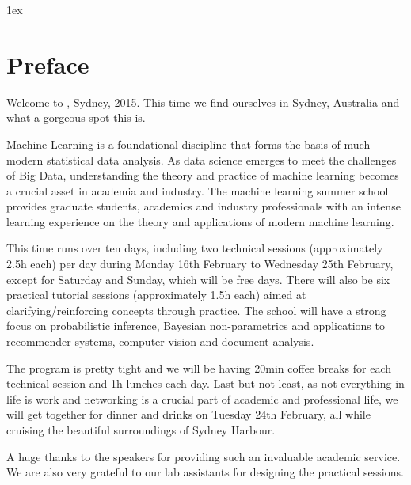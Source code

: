 {}
%
{\parskip 1ex
\section*{Preface}



                                                                     
                                             
Welcome to \mlss, Sydney, 2015. This time we find ourselves in Sydney, Australia and what a gorgeous spot this is.

Machine Learning is a foundational discipline that forms the basis of much modern statistical data analysis. As data science emerges to meet the challenges of Big Data, understanding the theory and practice of machine learning becomes a crucial asset in academia and industry.
The machine learning summer school provides graduate students, academics and industry professionals with an intense learning experience on the theory and applications of modern machine learning. 

This time \mlss runs over ten days, including two technical sessions (approximately 2.5h each) per day during Monday 16th February to Wednesday 25th February, except for Saturday and Sunday, which will be free days. There will also be six practical tutorial sessions (approximately 1.5h each) aimed at clarifying/reinforcing concepts through practice. The school will have a strong focus on probabilistic inference,  Bayesian non-parametrics and applications to recommender systems, computer vision and document analysis. 

The program is pretty tight and we will be having 20min coffee breaks for each technical session and 1h lunches each day.  Last but not least, as not everything in life is work and networking is a crucial part of academic and professional life, we will get together for dinner and drinks on Tuesday 24th February, all while  cruising the  beautiful surroundings of  Sydney Harbour.

A huge thanks to the speakers for providing such an invaluable academic service. We are also very grateful to our lab assistants for designing the practical sessions. 

}
